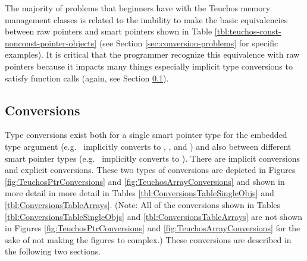 \documentclass[pdf,ps2pdf,11pt]{SANDreport}
\begin{document}
The majority of problems that beginners have with the Teuchos memory
management classes is related to the inability to make the basic
equivalencies between raw pointers and smart pointers shown in Table
{}\ref{tbl:teuchos-const-nonconst-pointer-objects} (see Section
{}\ref{sec:conversion-problems} for specific examples).  It is
critical that the programmer recognize this equivalence with raw
pointers because it impacts many things especially implicit type
conversions to satisfy function calls (again, see Section
{}\ref{sec:conversions}).


%
{}\subsection{Conversions}
\label{sec:conversions}
%

Type conversions exist both for a single smart pointer type for the
embedded type argument (e.g.\ {} implicitly converts
to {}, {}, and {}) and also between different smart pointer types (e.g.\
{} implicitly converts to {}).  There are
implicit conversions and explicit conversions.  These two types of
conversions are depicted in Figures {}\ref{fig:TeuchosPtrConversions}
and {}\ref{fig:TeuchosArrayConversions} and shown in more detail in
more detail in Tables {}\ref{tbl:ConversionsTableSingleObjs} and
{}\ref{tbl:ConversionsTableArrays}.  (Note: All of the conversions
shown in Tables {}\ref{tbl:ConversionsTableSingleObjs} and
{}\ref{tbl:ConversionsTableArrays} are not shown in Figures
{}\ref{fig:TeuchosPtrConversions} and
{}\ref{fig:TeuchosArrayConversions} for the sake of not making the
figures to complex.)  These conversions are described in the following
two sections.
\end{document}
